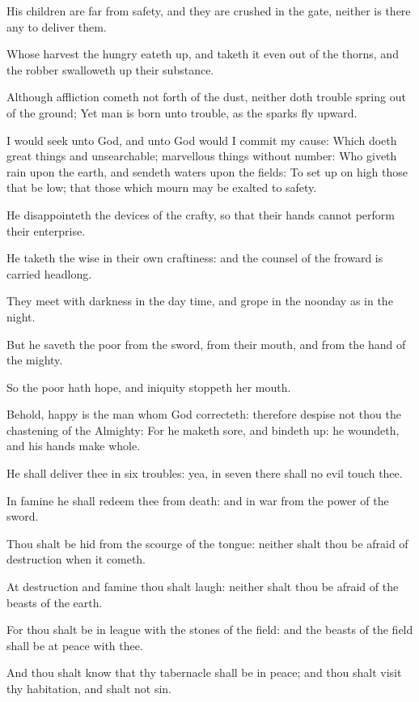 \verse His children are far from safety, and they are crushed in the gate, neither is there any to deliver them.

\verse Whose harvest the hungry eateth up, and taketh it even out of the thorns, and the robber swalloweth up their substance.

\verse Although affliction cometh not forth of the dust, neither doth trouble spring out of the ground; \verse Yet man is born unto trouble, as the sparks fly upward.

\verse I would seek unto God, and unto God would I commit my cause: \verse Which doeth great things and unsearchable; marvellous things without number: \verse Who giveth rain upon the earth, and sendeth waters upon the fields: \verse To set up on high those that be low; that those which mourn may be exalted to safety.

\verse He disappointeth the devices of the crafty, so that their hands cannot perform their enterprise.

\verse He taketh the wise in their own craftiness: and the counsel of the froward is carried headlong.

\verse They meet with darkness in the day time, and grope in the noonday as in the night.

\verse But he saveth the poor from the sword, from their mouth, and from the hand of the mighty.

\verse So the poor hath hope, and iniquity stoppeth her mouth.

\verse Behold, happy is the man whom God correcteth: therefore despise not thou the chastening of the Almighty: \verse For he maketh sore, and bindeth up: he woundeth, and his hands make whole.

\verse He shall deliver thee in six troubles: yea, in seven there shall no evil touch thee.

\verse In famine he shall redeem thee from death: and in war from the power of the sword.

\verse Thou shalt be hid from the scourge of the tongue: neither shalt thou be afraid of destruction when it cometh.

\verse At destruction and famine thou shalt laugh: neither shalt thou be afraid of the beasts of the earth.

\verse For thou shalt be in league with the stones of the field: and the beasts of the field shall be at peace with thee.

\verse And thou shalt know that thy tabernacle shall be in peace; and thou shalt visit thy habitation, and shalt not sin.

